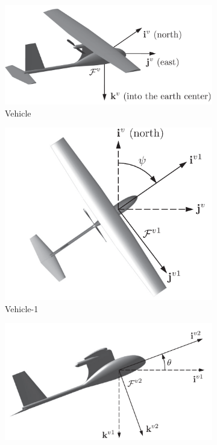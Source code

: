 \begin{figure}[!ht]
    \centering
    \begin{subfigure}{0.38\textwidth}
        \centering
         \includegraphics[width=\textwidth]{figures/vehicle.png}
         \caption{Vehicle}
         \label{fig:vehicle}
    \end{subfigure}
    \begin{subfigure}{0.38\textwidth}
        \centering
         \includegraphics[width=\textwidth]{figures/vehicle-1.png}
         \caption{Vehicle-1}
         \label{fig:vehicle-1}
    \end{subfigure}
    \begin{subfigure}{0.38\textwidth}
        \centering
         \includegraphics[width=\textwidth]{figures/vehicle-2.png}

\end{subfigure}
\end{figure}
